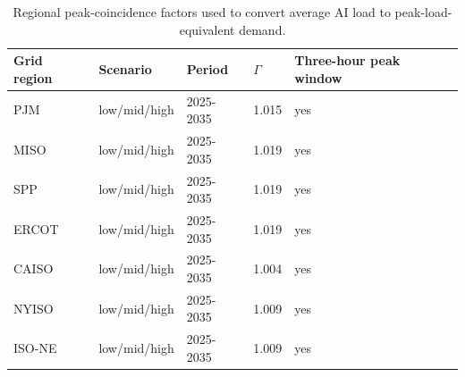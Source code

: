 \begingroup
\begin{table}[H]
\centering
\caption{Regional peak-coincidence factors used to convert average AI load to peak-load-equivalent demand.}
\label{tab:peak-coincidence-gamma}
\begin{tabular}{lllll}
\toprule
Grid region & Scenario & Period & $\Gamma$ & Three-hour peak window \\
\midrule
PJM & low/mid/high & 2025-2035 & 1.015 & yes \\
MISO & low/mid/high & 2025-2035 & 1.019 & yes \\
SPP & low/mid/high & 2025-2035 & 1.019 & yes \\
ERCOT & low/mid/high & 2025-2035 & 1.019 & yes \\
CAISO & low/mid/high & 2025-2035 & 1.004 & yes \\
NYISO & low/mid/high & 2025-2035 & 1.009 & yes \\
ISO-NE & low/mid/high & 2025-2035 & 1.009 & yes \\
\bottomrule
\end{tabular}
\end{table}
\endgroup
